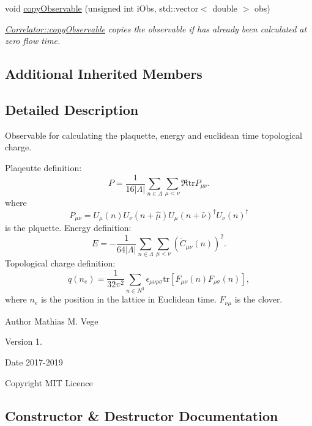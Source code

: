\begin{DoxyCompactItemize}
void \mbox{\hyperlink{class_master_sampler_topc_x_y_z_a49ef8ccce4bf9473017bbb7c01f1404b}{copy\+Observable}} (unsigned int i\+Obs, std\+::vector$<$ double $>$ obs)
\begin{DoxyCompactList}\small\item\em \mbox{\hyperlink{class_correlator_ac780d8b180294ee4801ede6e6a13f7f4}{Correlator\+::copy\+Observable}} copies the observable if has already been calculated at zero flow time. \end{DoxyCompactList}\end{DoxyCompactItemize}
\subsection*{Additional Inherited Members}


\subsection{Detailed Description}
Observable for calculating the plaquette, energy and euclidean time topological charge. 

Plaqeutte definition\+: \[ P = \frac{1}{16|\Lambda|} \sum_{n\in\Lambda} \sum_{\mu < \nu} \Re \mathrm{tr} P_{\mu\nu}. \] where \[ P_{\mu\nu}=U_\mu(n) U_{\nu}(n+\hat{\mu}) U_{\mu}(n+\hat{\nu})^\dagger U_{\nu} (n)^\dagger \] is the plquette. Energy definition\+: \[ E = -\frac{1}{64|\Lambda|} \sum_{n\in\Lambda} \sum_{\mu<\nu} \left(\tilde{C}_{\mu\nu}(n)\right)^2. \] Topological charge definition\+: \[ q(n_e) = \frac{1}{32\pi^2} \sum_{n\in N^3} \epsilon_{\mu\nu\rho\sigma} \mathrm{tr}\left[F_{\mu\nu}(n)F_{\rho\sigma}(n)\right], \] where $n_e$ is the position in the lattice in Euclidean time. $F_{\nu\mu}$ is the clover.

\begin{DoxyAuthor}{Author}
Mathias M. Vege 
\end{DoxyAuthor}
\begin{DoxyVersion}{Version}
1. 
\end{DoxyVersion}
\begin{DoxyDate}{Date}
2017-\/2019 
\end{DoxyDate}
\begin{DoxyCopyright}{Copyright}
M\+IT Licence 
\end{DoxyCopyright}


\subsection{Constructor \& Destructor Documentation}
\mbox{\label{class_master_sampler_topc_x_y_z_ad8ba8f2c50c66d823c551f71fd62a99b}} 

